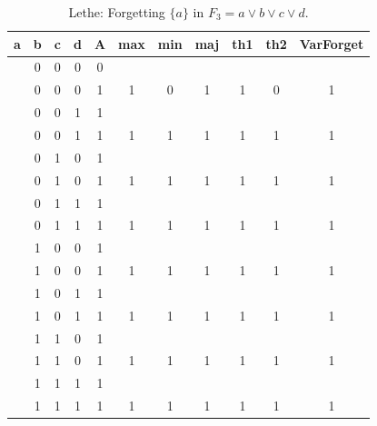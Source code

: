 \begin{table}[!tb]
    \centering
    \begin{tabular}{|c|c|c|c|c|c|c|c|c|c|c|}
        \hline
        \textbf{a} & \textbf{b} & \textbf{c} & \textbf{d} & \textbf{A} & \textbf{max} & \textbf{min} & \textbf{maj} & \textbf{th1} & \textbf{th2} & \textbf{VarForget} \\ \hline
        \rowcolor{gray!40}  & 0 & 0 & 0 & 0 &  &  &  &  &  &  \\ \hline
        \rowcolor{gray!40}  & 0 & 0 & 0 & 1 & 1 & 0 & 1 & 1 & 0 & 1 \\ \hline
        \rowcolor{blue!40}  & 0 & 0 & 1 & 1 &  &  &  &  &  &  \\ \hline
        \rowcolor{blue!40}  & 0 & 0 & 1 & 1 & 1 & 1 & 1 & 1 & 1 & 1 \\ \hline
        \rowcolor{red!40}  & 0 & 1 & 0 & 1 &  &  &  &  &  &  \\ \hline
        \rowcolor{red!40}  & 0 & 1 & 0 & 1 & 1 & 1 & 1 & 1 & 1 & 1 \\ \hline
        \rowcolor{green!40}  & 0 & 1 & 1 & 1 &  &  &  &  &  &  \\ \hline
        \rowcolor{green!40}  & 0 & 1 & 1 & 1 & 1 & 1 & 1 & 1 & 1 & 1 \\ \hline
        \rowcolor{yellow!40}  & 1 & 0 & 0 & 1 &  &  &  &  &  &  \\ \hline
        \rowcolor{yellow!40}  & 1 & 0 & 0 & 1 & 1 & 1 & 1 & 1 & 1 & 1 \\ \hline
        \rowcolor{gray!40}  & 1 & 0 & 1 & 1 &  &  &  &  &  &  \\ \hline
        \rowcolor{gray!40}  & 1 & 0 & 1 & 1 & 1 & 1 & 1 & 1 & 1 & 1 \\ \hline
        \rowcolor{blue!40}  & 1 & 1 & 0 & 1 &  &  &  &  &  &  \\ \hline
        \rowcolor{blue!40}  & 1 & 1 & 0 & 1 & 1 & 1 & 1 & 1 & 1 & 1 \\ \hline
        \rowcolor{red!40}  & 1 & 1 & 1 & 1 &  &  &  &  &  &  \\ \hline
        \rowcolor{red!40}  & 1 & 1 & 1 & 1 & 1 & 1 & 1 & 1 & 1 & 1 \\ \hline
    \end{tabular}
    \caption{Lethe: Forgetting $\{a\}$ in $F_{3} = a \lor b \lor c \lor d$.}
    \label{tab:lethe-F3-a}
\end{table}
